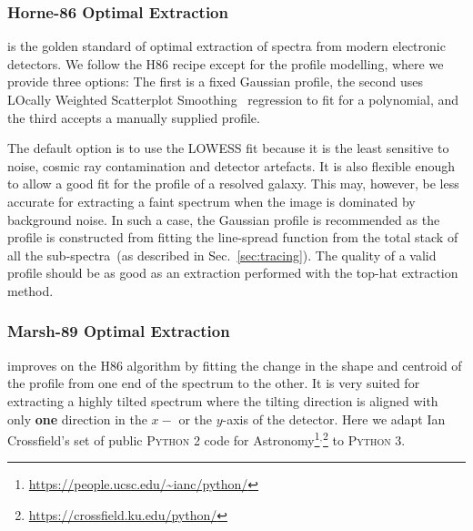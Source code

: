 \documentclass[twocolumn, linenumbers]{aastex631}
\begin{document}
\subsubsection*{Horne-86 Optimal Extraction}
\citet[hereafter H86]{1986PASP...98..609H} is the golden standard
of optimal extraction of spectra from modern electronic detectors.
We follow the H86 recipe except for the profile modelling,
where we provide three options: The first is a fixed Gaussian
profile, the second uses LOcally Weighted Scatterplot
Smoothing~\citep[LOWESS]{doi:10.1080/01621459.1979.10481038}
regression to fit for a polynomial, and the third accepts
a manually supplied profile.

The default option is to use the LOWESS fit because it is the
least sensitive to noise, cosmic ray contamination and detector
artefacts. It is also flexible enough to allow a good fit for
the profile of a resolved galaxy. This may, however, be less
accurate for extracting a faint spectrum when the image is
dominated by background noise. In such a case, the Gaussian
profile is recommended as the profile is constructed from fitting
the line-spread function from the total stack of all the
sub-spectra~(as described in Sec.~\ref{sec:tracing}). The quality
of a valid profile should be as good as an extraction
performed with the top-hat extraction method.

\subsubsection*{Marsh-89 Optimal Extraction}
\citet[hereafter M89]{1989PASP..101.1032M} improves on the H86
algorithm by fitting the change in the shape and centroid of the
profile from one end of the spectrum to the other. It is very
suited for extracting a highly tilted spectrum where the tilting
direction is aligned with only \textbf{one} direction in the $x-$
or the $y$-axis of the detector. Here we adapt Ian Crossfield's set of public
\textsc{Python 2} code for Astronomy\footnote{\url{https://people.ucsc.edu/~ianc/python/}}$^,$\footnote{\url{https://crossfield.ku.edu/python/}}
to \textsc{Python 3}.
\end{document}
